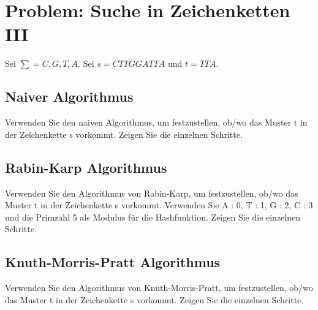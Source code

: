 \section{Problem: Suche in Zeichenketten III}

 Sei $\sum = C, G, T, A.$ Sei $s = CTTGGATTA$ und $t = TTA$.



\subsection{Naiver Algorithmus}
Verwenden Sie den naiven Algorithmus, um festzustellen, ob/wo das Muster t
in der Zeichenkette s vorkommt.
Zeigen Sie die einzelnen Schritte.

\subsection{Rabin-Karp Algorithmus}
Verwenden Sie den Algorithmus von Rabin-Karp, um festzustellen, ob/wo das
Muster t in der Zeichenkette s vorkommt. Verwenden Sie A : 0, T : 1, G : 2, C :
3 und die Primzahl 5 als Modulus für die Hashfunktion.
Zeigen Sie die einzelnen Schritte.

\subsection{Knuth-Morris-Pratt Algorithmus}
Verwenden Sie den Algorithmus von Knuth-Morris-Pratt, um festzustellen,
ob/wo das Muster t in der Zeichenkette s vorkommt.
Zeigen Sie die einzelnen Schritte.

